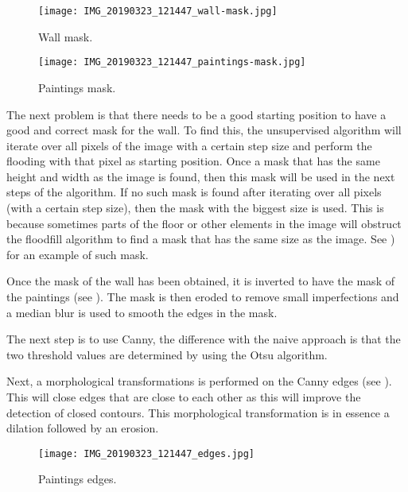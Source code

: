 \begin{figure}[h]
    \centering
    \begin{minipage}[b]{0.45\textwidth}
        \texttt{[image: IMG\_20190323\_121447\_wall-mask.jpg]}
        \caption{Wall mask.}
        \label{fig:paiting_detection_wall-mask}
    \end{minipage}
    \hfill
    \begin{minipage}[b]{0.45\textwidth}
        \texttt{[image: IMG\_20190323\_121447\_paintings-mask.jpg]}
        \caption{Paintings mask.}
        \label{fig:paiting_detection_paintings-mask}
    \end{minipage}
\end{figure}

The next problem is that there needs to be a good starting position to have a good and correct mask for the wall. To find this, the unsupervised algorithm will iterate over all pixels of the image with a certain step size and perform the flooding with that pixel as starting position. Once a mask that has the same height and width as the image is found, then this mask will be used in the next steps of the algorithm. If no such mask is found after iterating over all pixels (with a certain step size), then the mask with the biggest size is used. This is because sometimes parts of the floor or other elements in the image will obstruct the floodfill algorithm to find a mask that has the same size as the image. See ) for an example of such mask.

Once the mask of the wall has been obtained, it is inverted to have the mask of the paintings (see ). The mask is then eroded to remove small imperfections and a median blur is used to smooth the edges in the mask.

The next step is to use Canny, the difference with the naive approach is that the two threshold values are determined by using the Otsu algorithm.

Next, a morphological transformations is performed on the Canny edges (see ). This will close edges that are close to each other as this will improve the detection of closed contours. This morphological transformation is in essence a dilation followed by an erosion.

\begin{figure}[h]
    \texttt{[image: IMG\_20190323\_121447\_edges.jpg]}
    \centering
    \caption{Paintings edges.}
    \label{fig:paiting_detection_paintings-edges}
\end{figure}

